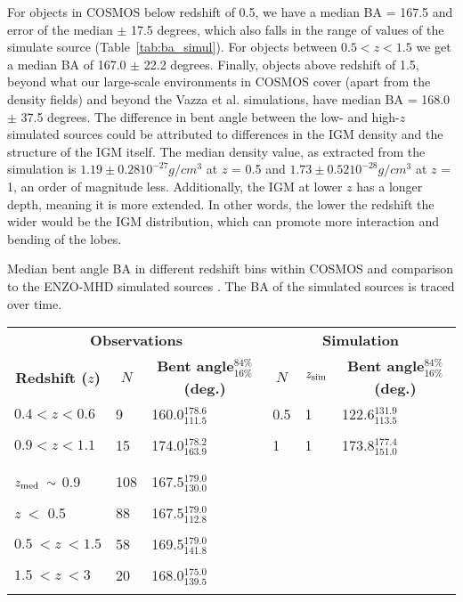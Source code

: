 \documentclass[galaxies,article,submit,moreauthors,pdftex]{Definitions/mdpi}
\begin{document}
For objects in COSMOS below redshift of 0.5, we have a median BA = 167.5 and error of the median $\pm$ 17.5 degrees, which also falls in the range of values of the simulate source (Table~\ref{tab:ba_simul}). For objects between $0.5 < z < 1.5$ we get a median BA of 167.0 $\pm$ 22.2 degrees. Finally, objects above redshift of 1.5, beyond what our large-scale environments in COSMOS cover (apart from the density fields) and beyond the Vazza et al. simulations, have median BA = 168.0 $\pm$ 37.5 degrees. The difference in bent angle between the low- and high-$z$ simulated sources could be attributed to differences in the IGM density and the structure of the IGM itself. The median density value, as extracted from the simulation is $1.19 \pm 0.28 10^{-27} g/cm^{3}$ at $z$ = 0.5 and $1.73 \pm 0.52 10^{-28} g/cm^{3}$ at $z$ = 1, an order of magnitude less. Additionally, the IGM at lower $z$ has a longer depth, meaning it is more extended. In other words, the lower the redshift the wider would be the IGM distribution, which can promote more interaction and bending of the lobes.  





\begin{specialtable}[H] 
\caption{Median bent angle BA in different redshift bins within COSMOS and comparison to the ENZO-MHD simulated sources \cite{vazza21}. The BA of the simulated sources is traced over time.}
\label{tab:ba_simul}
\begin{tabular}{l l l | l l l}
\toprule
 \multicolumn{3}{c}{\textbf{Observations}} & \multicolumn{3}{c}{\textbf{Simulation}} \\
\multicolumn{1}{c}{\textbf{Redshift ($z$)}} & 
\multicolumn{1}{c}{\textbf{$N$}} &
\multicolumn{1}{c}{\textbf{Bent angle$^{84\%}_{16\%}$ (deg.)}} &
\multicolumn{1}{c}{\textbf{$N$}} &
\multicolumn{1}{c}{\textbf{$z_{\rm sim}$}} & \multicolumn{1}{c}{\textbf{Bent angle$^{84\%}_{16\%}$ (deg.)}}  \\     
\midrule
$0.4 < z < 0.6$ & 9 & 160.0$^{178.6}_{111.5}$  & 0.5 & 1 & 122.6$^{131.9}_{113.5}$\\
& & &\\
$0.9 < z < 1.1$ & 15 & 174.0$^{178.2}_{163.9}$  & 1 & 1 & 173.8$^{177.4}_{151.0}$ \\
& & &\\
\hline
& & &\\
$z_{\rm med}~ \sim$  0.9 & 108 &167.5$^{179.0}_{130.0}$ \\
& & &\\ 
$z ~<$ 0.5 & 88 &  167.5$^{179.0}_{112.8}$ & \\
& & &\\
$0.5 ~< z ~< 1.5 $ & 58 &169.5$^{179.0}_{141.8}$ &\\
& & &\\
$ 1.5 ~< z ~< 3$ & 20 &168.0$^{175.0}_{139.5}$ \\ 
& & &\\
\bottomrule
\end{tabular}
\end{specialtable}
\end{document}
